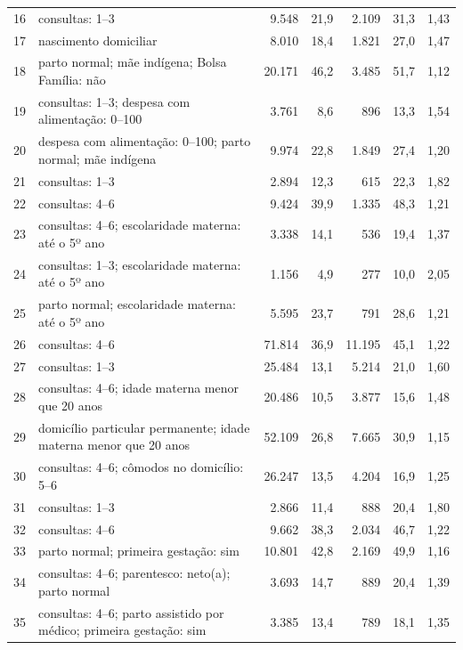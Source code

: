 \begin{table}[H]
\begin{tabularx}{\textwidth}{@{}c Y r r r r r@{}}
16 & consultas: 1--3 & 9.548 & 21,9 & 2.109 & 31,3 & 1,43 \\
17 & nascimento domiciliar & 8.010 & 18,4 & 1.821 & 27,0 & 1,47 \\
18 & parto normal; mãe indígena; Bolsa Família: não & 20.171 & 46,2 & 3.485 & 51,7 & 1,12 \\
19 & consultas: 1--3; despesa com alimentação: 0--100 & 3.761 & 8,6 & 896 & 13,3 & 1,54 \\
20 & despesa com alimentação: 0--100; parto normal; mãe indígena & 9.974 & 22,8 & 1.849 & 27,4 & 1,20 \\

21 & consultas: 1--3 & 2.894 & 12,3 & 615 & 22,3 & 1,82 \\
22 & consultas: 4--6 & 9.424 & 39,9 & 1.335 & 48,3 & 1,21 \\
23 & consultas: 4--6; escolaridade materna: até o 5º ano & 3.338 & 14,1 & 536 & 19,4 & 1,37 \\
24 & consultas: 1--3; escolaridade materna: até o 5º ano & 1.156 & 4,9 & 277 & 10,0 & 2,05 \\
25 & parto normal; escolaridade materna: até o 5º ano & 5.595 & 23,7 & 791 & 28,6 & 1,21 \\

26 & consultas: 4--6 & 71.814 & 36,9 & 11.195 & 45,1 & 1,22 \\
27 & consultas: 1--3 & 25.484 & 13,1 & 5.214 & 21,0 & 1,60 \\
28 & consultas: 4--6; idade materna menor que 20 anos & 20.486 & 10,5 & 3.877 & 15,6 & 1,48 \\
29 & domicílio particular permanente; idade materna menor que 20 anos & 52.109 & 26,8 & 7.665 & 30,9 & 1,15 \\
30 & consultas: 4--6; cômodos no domicílio: 5--6 & 26.247 & 13,5 & 4.204 & 16,9 & 1,25 \\

31 & consultas: 1--3 & 2.866 & 11,4 & 888 & 20,4 & 1,80 \\
32 & consultas: 4--6 & 9.662 & 38,3 & 2.034 & 46,7 & 1,22 \\
33 & parto normal; primeira gestação: sim & 10.801 & 42,8 & 2.169 & 49,9 & 1,16 \\
34 & consultas: 4--6; parentesco: neto(a); parto normal & 3.693 & 14,7 & 889 & 20,4 & 1,39 \\
35 & consultas: 4--6; parto assistido por médico; primeira gestação: sim & 3.385 & 13,4 & 789 & 18,1 & 1,35 \\


\end{tabularx}
\end{table}
